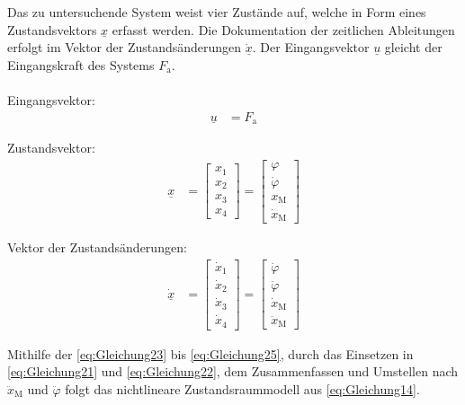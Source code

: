 \documentclass[
	pagesize,
	fontsize=12pt,
	paper=a4,
	oneside,
   reqno
]{scrartcl}
\begin{document}
Das zu untersuchende System weist vier Zustände auf, welche in Form eines Zustandsvektors $\underline{x}$ erfasst werden. Die Dokumentation der zeitlichen Ableitungen erfolgt im Vektor der Zustandsänderungen $\dot{\underline{x}}$. Der Eingangsvektor $\underline{u}$ gleicht der Eingangskraft des Systems $F_{\mathrm{a}}$.
\\\\Eingangsvektor:
\begin{align}\label{eq:Gleichung23}
    \underline{u} &= F_{\mathrm{a}}
\end{align}

Zustandsvektor:
\begin{align}
    \underline{x} &=
    \begin{bmatrix}\label{eq:Gleichung24}
        x_{\mathrm{1}} \\
        x_{\mathrm{2}} \\
        x_{\mathrm{3}} \\
        x_{\mathrm{4}}
    \end{bmatrix} =
    \begin{bmatrix}
        \varphi         \\
        \dot \varphi    \\
        x_{\mathrm{M}}  \\
        \dot x_{\mathrm{M}}
    \end{bmatrix}
\end{align}

Vektor der Zustandsänderungen:
\begin{align}\label{eq:Gleichung25}
    \dot{\underline{x}} &=
    \begin{bmatrix}
        \dot x_{\mathrm{1}} \\
        \dot x_{\mathrm{2}} \\
        \dot x_{\mathrm{3}} \\
        \dot x_{\mathrm{4}}
    \end{bmatrix} =
    \begin{bmatrix}
        \dot{\varphi}           \\
        \ddot{\varphi}          \\
        \dot{x}_{\mathrm{M}}    \\
        \ddot{x}_{\mathrm{M}}
    \end{bmatrix}
\end{align}

Mithilfe der \autoref{eq:Gleichung23} bis \autoref{eq:Gleichung25}, durch das Einsetzen in \autoref{eq:Gleichung21} und \autoref{eq:Gleichung22}, dem Zusammenfassen und Umstellen nach $\ddot x_{\mathrm{M}}$ und $\ddot \varphi$ folgt das nichtlineare Zustandsraummodell aus \autoref{eq:Gleichung14}.
\end{document}
